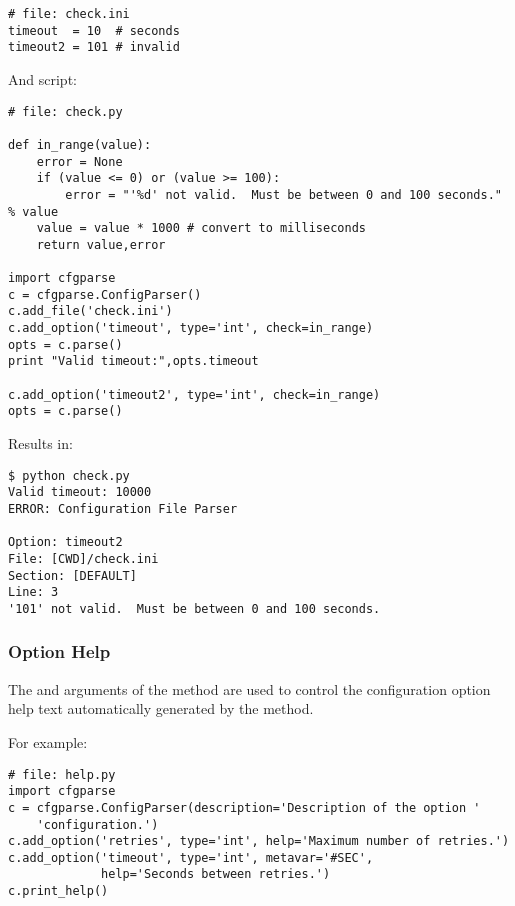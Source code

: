 \documentclass{howto}
\begin{document}
\begin{verbatim}
# file: check.ini
timeout  = 10  # seconds
timeout2 = 101 # invalid
\end{verbatim}

And script:

\begin{verbatim}
# file: check.py

def in_range(value):
    error = None
    if (value <= 0) or (value >= 100):
        error = "'%d' not valid.  Must be between 0 and 100 seconds." % value        
    value = value * 1000 # convert to milliseconds
    return value,error
    
import cfgparse
c = cfgparse.ConfigParser()
c.add_file('check.ini')
c.add_option('timeout', type='int', check=in_range)
opts = c.parse()
print "Valid timeout:",opts.timeout

c.add_option('timeout2', type='int', check=in_range)
opts = c.parse()
\end{verbatim}

Results in:
\begin{verbatim}
$ python check.py
Valid timeout: 10000
ERROR: Configuration File Parser

Option: timeout2
File: [CWD]/check.ini
Section: [DEFAULT]
Line: 3
'101' not valid.  Must be between 0 and 100 seconds.
\end{verbatim}
 
\subsubsection{Option Help\label{cfgparse-option-help}}

The  and  arguments of the  method 
are used to control the configuration option help text automatically generated 
by the  method.

For example:

\begin{verbatim}
# file: help.py
import cfgparse
c = cfgparse.ConfigParser(description='Description of the option '
    'configuration.')
c.add_option('retries', type='int', help='Maximum number of retries.')
c.add_option('timeout', type='int', metavar='#SEC', 
             help='Seconds between retries.')
c.print_help()
\end{verbatim}
\end{document}

